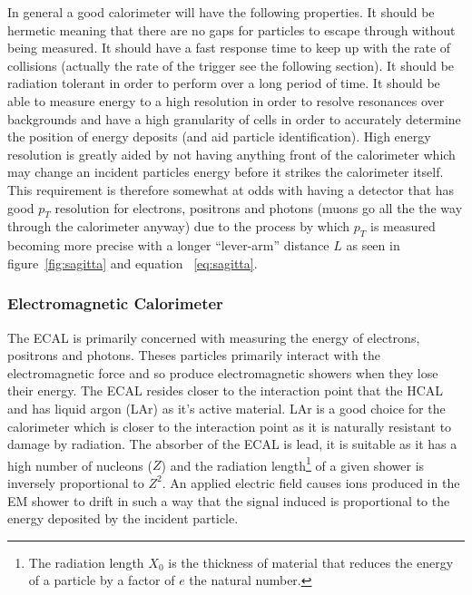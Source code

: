 In general a good calorimeter will have the following properties. It should be
hermetic meaning that there are no gaps for particles to escape through without
being measured. It should have a fast response time to keep up with the rate of
collisions (actually the rate of the trigger see the following section). It
should be radiation tolerant in order to perform over a long period of time. It
should be able to measure energy to a high resolution in order to resolve
resonances over backgrounds and have a high granularity of cells in order to
accurately determine the position of energy deposits (and aid particle
identification). High energy resolution is greatly aided by not having anything
front of the calorimeter which may change an incident particles energy before it
strikes the calorimeter itself. This requirement is therefore somewhat at odds
with having a detector that has good $p_T$ resolution for electrons, positrons
and photons (muons go all the the way through the calorimeter anyway) due to the
process by which $p_T$ is measured becoming more precise with a longer
``lever-arm'' distance $L$ as seen in figure~\ref{fig:sagitta} and equation
~\ref{eq:sagitta}.

\subsubsection{Electromagnetic Calorimeter}
The ECAL is primarily concerned with measuring the energy of electrons,
positrons and photons. Theses particles primarily interact with the
electromagnetic force and so produce electromagnetic showers when they lose
their energy. The ECAL resides closer to the interaction point that the HCAL and
has liquid argon (LAr) as it's active material. LAr is a good choice for the
calorimeter which is closer to the interaction point as it is naturally
resistant to damage by radiation. The absorber of the ECAL is lead, it is
suitable as it has a high number of nucleons ($Z$) and the radiation
length\footnote{The radiation length $X_{0}$ is the thickness of material that
  reduces the energy of a particle by a factor of $e$ the natural number.} of a
given shower is inversely proportional to $Z^2$. An applied electric field
causes ions produced in the EM shower to drift in such a way that the signal
induced is proportional to the energy deposited by the incident particle.

